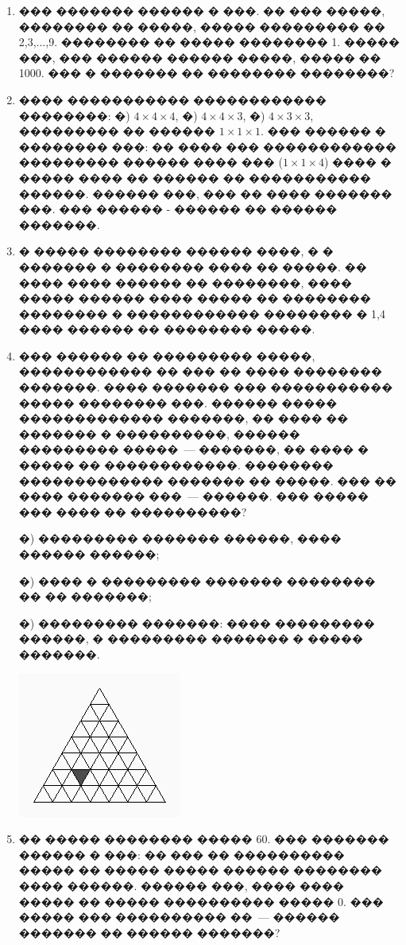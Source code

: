\documentclass[a4paper,12pt]{article}
\begin{document}
\begin{enumerate}
\item ��� ������� ������ � ���. �� ��� �����, �������� �� �����, ����� ��������� �� 2,3,...,9. �������� �� ����� �������� 1. ����� ���, ��� ������ ������ �����, ����� �� 1000. ��� � ������� �� �������� ��������?

\item ���� ����������� ������������ ��������: �) $4\times 4\times 4$, �) $4\times 4\times 3$, �) $4\times 3\times 3$, ��������� �� ������ $1\times 1\times 1$. ��� ������ � �������� ���: �� ���� ��� ������������ ��������� ������ ���� ��� ($1\times 1\times 4$) ���� � ����� ���� �� ������ �� ����������� ������. ������ ���, ��� �� ���� ������� ���. ��� ������ - ������ �� ������ �������.

\item � ����� �������� ������ ����, � � ������� � �������� ���� �� �����. �� ���� ���� ������  �� ��������, ���� ����� ������ ���� ����� �� �������� �������� � ������������ �������� � 1,4 ���� ������ �� �������� �����.

\item ��� ������ �� ��������� �����, ������������ �� ��� �� ���� �������� �������. ���� ������� ��� ����������� ����� �������� ���. ������ ����� ������������� �������, �� ���� �� ������� � ����������, ������ ��������� �����~--- �������, �� ���� � ����� �� ������������. �������� ������������� ������� �� �����. ��� �� ���� ������� ���~--- ������. ��� ����� ��� ���� �� ����������?

�) ��������� ������� ������, ���� ������ ������;

�) ���� � ��������� ������� �������� �� �� �������;

�) ��������� �������: ���� ��������� ������, � ��������� ������� � ����� �������.

\includegraphics{triangle}

\item  �� ����� �������� ����� $60$. ��� ������� ������ � ���: �� ��� �� ���������� ����� �� ����� ����� ������ �������� ���� ������. ������ ���, ���� ���� ����� �� ����� ���������� ����� $0$. ��� ����� ��� ���������� ��~--- ������ ������� �� ������ �������?


\end{enumerate}
\end{document}
